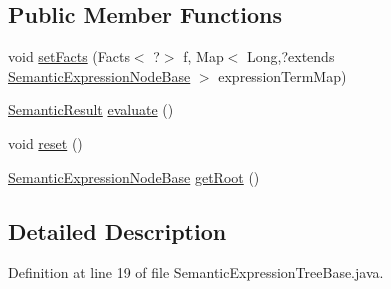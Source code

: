 \subsection*{Public Member Functions}
\begin{DoxyCompactItemize}
\item 
void \hyperlink{interfaceit_1_1emarolab_1_1cagg_1_1core_1_1evaluation_1_1semanticGrammar_1_1syntaxCompiler_1_1SemanticExpressionTreeBase_ac00faa6b526d192463865e6aab5bb387}{set\-Facts} (Facts$<$ ?$>$ f, Map$<$ Long,?extends \hyperlink{classit_1_1emarolab_1_1cagg_1_1core_1_1evaluation_1_1semanticGrammar_1_1syntaxCompiler_1_1Semantec1f2fc886c35d505e2bc10592e2dff6}{Semantic\-Expression\-Node\-Base} $>$ expression\-Term\-Map)
\item 
\hyperlink{classit_1_1emarolab_1_1cagg_1_1core_1_1evaluation_1_1semanticGrammar_1_1syntaxCompiler_1_1Semant5d395032261986aec1b33357dd21b6bb}{Semantic\-Result} \hyperlink{interfaceit_1_1emarolab_1_1cagg_1_1core_1_1evaluation_1_1semanticGrammar_1_1syntaxCompiler_1_1SemanticExpressionTreeBase_a52b61b961a18665bc17a7f85a8e128f9}{evaluate} ()
\item 
void \hyperlink{interfaceit_1_1emarolab_1_1cagg_1_1core_1_1evaluation_1_1semanticGrammar_1_1syntaxCompiler_1_1SemanticExpressionTreeBase_ae5d798bab705cef02fefd76f9db9be1c}{reset} ()
\item 
\hyperlink{classit_1_1emarolab_1_1cagg_1_1core_1_1evaluation_1_1semanticGrammar_1_1syntaxCompiler_1_1Semantec1f2fc886c35d505e2bc10592e2dff6}{Semantic\-Expression\-Node\-Base} \hyperlink{interfaceit_1_1emarolab_1_1cagg_1_1core_1_1evaluation_1_1semanticGrammar_1_1syntaxCompiler_1_1SemanticExpressionTreeBase_a718a34a2996765a4b5f5dc342425854f}{get\-Root} ()
\end{DoxyCompactItemize}


\subsection{Detailed Description}


Definition at line 19 of file Semantic\-Expression\-Tree\-Base.\-java.




